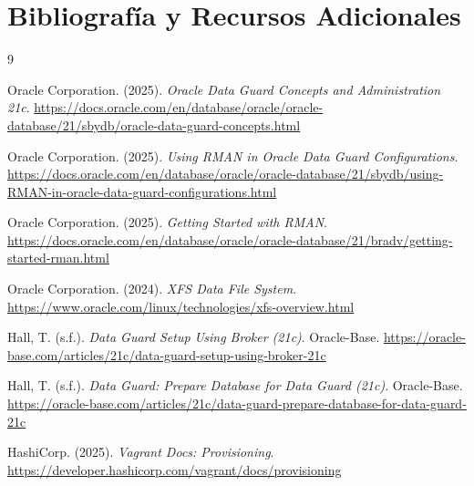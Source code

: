\documentclass[11pt, a4paper]{report}
\begin{document}
\newpage


\chapter*{Bibliografía y Recursos Adicionales}

\begin{thebibliography}{9}

Oracle Corporation. (2025). \textit{Oracle Data Guard Concepts and Administration 21c}.
\url{https://docs.oracle.com/en/database/oracle/oracle-database/21/sbydb/oracle-data-guard-concepts.html}

Oracle Corporation. (2025). \textit{Using RMAN in Oracle Data Guard Configurations}.
\url{https://docs.oracle.com/en/database/oracle/oracle-database/21/sbydb/using-RMAN-in-oracle-data-guard-configurations.html}

Oracle Corporation. (2025). \textit{Getting Started with RMAN}.
\url{https://docs.oracle.com/en/database/oracle/oracle-database/21/bradv/getting-started-rman.html}

Oracle Corporation. (2024). \textit{XFS Data File System}.
\url{https://www.oracle.com/linux/technologies/xfs-overview.html}

Hall, T. (s.f.). \textit{Data Guard Setup Using Broker (21c)}. Oracle-Base.
\url{https://oracle-base.com/articles/21c/data-guard-setup-using-broker-21c}

Hall, T. (s.f.). \textit{Data Guard: Prepare Database for Data Guard (21c)}. Oracle-Base.
\url{https://oracle-base.com/articles/21c/data-guard-prepare-database-for-data-guard-21c}

HashiCorp. (2025). \textit{Vagrant Docs: Provisioning}.
\url{https://developer.hashicorp.com/vagrant/docs/provisioning}

\end{thebibliography}
\end{document}
